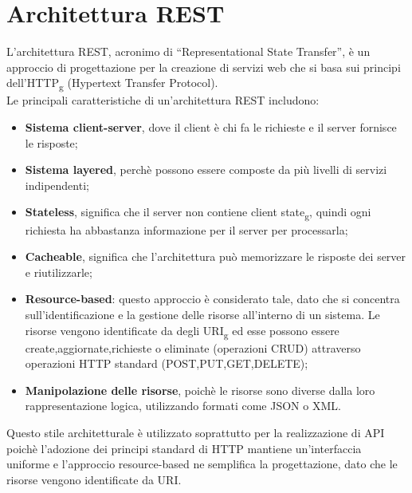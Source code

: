 \section{Architettura REST}
L’architettura REST, acronimo di “Representational State Transfer”, è un approccio di progettazione per la creazione di servizi web che si basa sui principi dell’HTTP\textsubscript{g} (Hypertext Transfer Protocol).\\
Le principali caratteristiche di un’architettura REST includono:
\begin{itemize}
\item \textbf{Sistema client-server}, dove il client è chi fa le richieste e il server fornisce le risposte;
\item \textbf{Sistema layered}, perchè possono essere composte da più livelli di servizi indipendenti;
\item \textbf{Stateless}, significa che il server non contiene client state\textsubscript{g}, quindi ogni richiesta ha abbastanza informazione per il server per processarla;
\item \textbf{Cacheable}, significa che l’architettura può memorizzare le risposte dei server e riutilizzarle;
\item \textbf{Resource-based}: questo approccio è considerato tale, dato che si concentra sull’identificazione e la gestione delle risorse all’interno di un sistema. Le risorse vengono identificate da degli URI\textsubscript{g} ed esse possono essere create,aggiornate,richieste o eliminate (operazioni CRUD) attraverso operazioni HTTP standard (POST,PUT,GET,DELETE);
\item \textbf{Manipolazione delle risorse}, poichè le risorse sono diverse dalla loro rappresentazione logica, utilizzando formati come JSON o XML.
\end{itemize}
Questo stile architetturale è utilizzato soprattutto per la realizzazione di API poichè l'adozione dei principi standard di HTTP mantiene un'interfaccia uniforme e l'approccio resource-based ne semplifica la progettazione, dato che le risorse vengono identificate da URI.
